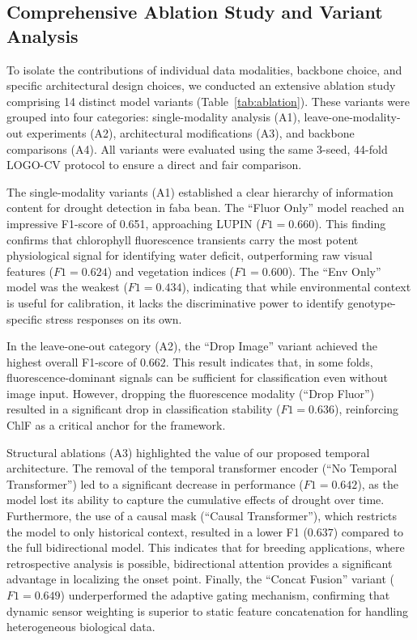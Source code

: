 \documentclass[a4paper,fleqn]{cas-dc}
\begin{document}
\subsection{Comprehensive Ablation Study and Variant Analysis}\label{sec:results:ablation}

To isolate the contributions of individual data modalities, backbone choice, and specific architectural design choices, we conducted an extensive ablation study comprising 14 distinct model variants (Table~\ref{tab:ablation}). These variants were grouped into four categories: single-modality analysis (A1), leave-one-modality-out experiments (A2), architectural modifications (A3), and backbone comparisons (A4). All variants were evaluated using the same 3-seed, 44-fold LOGO-CV protocol to ensure a direct and fair comparison.

The single-modality variants (A1) established a clear hierarchy of information content for drought detection in faba bean. The ``Fluor Only'' model reached an impressive F1-score of 0.651, approaching LUPIN ($F1=0.660$). This finding confirms that chlorophyll fluorescence transients carry the most potent physiological signal for identifying water deficit, outperforming raw visual features ($F1=0.624$) and vegetation indices ($F1=0.600$). The ``Env Only'' model was the weakest ($F1=0.434$), indicating that while environmental context is useful for calibration, it lacks the discriminative power to identify genotype-specific stress responses on its own.

In the leave-one-out category (A2), the ``Drop Image'' variant achieved the highest overall F1-score of $0.662$. This result indicates that, in some folds, fluorescence-dominant signals can be sufficient for classification even without image input. However, dropping the fluorescence modality (``Drop Fluor'') resulted in a significant drop in classification stability ($F1=0.636$), reinforcing ChlF as a critical anchor for the framework.

Structural ablations (A3) highlighted the value of our proposed temporal architecture. The removal of the temporal transformer encoder (``No Temporal Transformer'') led to a significant decrease in performance ($F1=0.642$), as the model lost its ability to capture the cumulative effects of drought over time. Furthermore, the use of a causal mask (``Causal Transformer''), which restricts the model to only historical context, resulted in a lower F1 ($0.637$) compared to the full bidirectional model. This indicates that for breeding applications, where retrospective analysis is possible, bidirectional attention provides a significant advantage in localizing the onset point. Finally, the ``Concat Fusion'' variant ($F1=0.649$) underperformed the adaptive gating mechanism, confirming that dynamic sensor weighting is superior to static feature concatenation for handling heterogeneous biological data.
\end{document}
